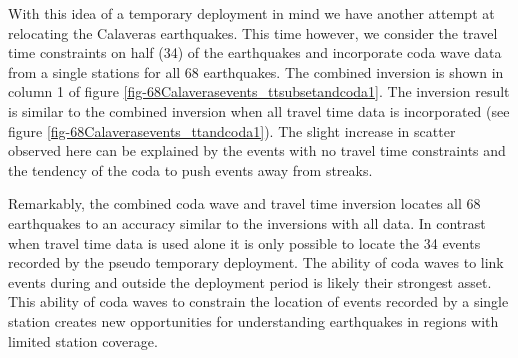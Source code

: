\documentclass[extra]{gji}
\begin{document}
With this idea of a temporary deployment in mind we have another
attempt at relocating the Calaveras earthquakes. This time however,
we consider the travel time constraints on half (34) of the
earthquakes and incorporate coda wave data from a single stations
for all 68 earthquakes. The combined inversion is shown in column 1
of figure \ref{fig-68Calaverasevents_ttsubsetandcoda1}. The
inversion result is similar to the combined inversion when all
travel time data is incorporated (see figure
\ref{fig-68Calaverasevents_ttandcoda1}). The slight increase in
scatter observed here can be explained by the events with no travel
time constraints and the tendency of the coda to push events away
from streaks.

Remarkably, the combined coda wave and travel time inversion locates
all 68 earthquakes to an accuracy similar to the inversions with all
data. In contrast when travel time data is used alone it is only
possible to locate the 34 events recorded by the pseudo temporary
deployment. The ability of coda waves to link events during and
outside the deployment period is likely their strongest asset. This
ability of  coda waves to constrain the location of events recorded
by a single station creates new opportunities for understanding
earthquakes in regions with limited station coverage.

\end{document}

